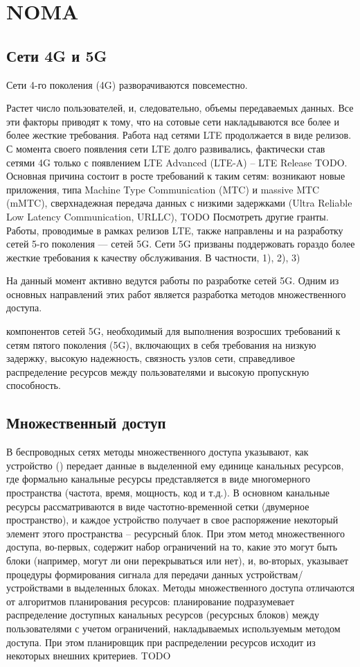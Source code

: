 \documentclass{book}
\numberwithin{theorem}{chapter}
\numberwithin{statement}{chapter}
\numberwithin{lemma}{chapter}
\theoremstyle{definition}
\numberwithin{task}{chapter}
\theoremstyle{remark}
\numberwithin{example}{chapter}
\theoremstyle{definition}
\numberwithin{definition}{chapter}
\theoremstyle{remark}
\theoremstyle{remark}
\numberwithin{lyrics}{section}
\begin{document}
\section{NOMA}
\subsection{Сети 4G и 5G}
Сети 4-го поколения (4G) разворачиваются повсеместно. 

Растет число пользователей, и, следовательно, объемы передаваемых данных. Все эти факторы приводят к тому, что на сотовые сети накладываются все более и более жесткие требования. Работа над сетями LTE продолжается в виде релизов. С момента своего появления сети LTE долго развивались, фактически став сетями 4G только с появлением LTE Advanced (LTE-A) -- LTE Release TODO.
Основная причина состоит в росте требований к таким сетям: возникают новые приложения, типа Machine Type Communication (MTC) и massive MTC (mMTC), сверхнадежная передача данных с низкими задержками (Ultra Reliable Low Latency Communication, URLLC), TODO Посмотреть другие гранты. Работы, проводимые в рамках релизов LTE, также направлены и на разработку сетей 5-го поколения --- сетей 5G. Сети 5G призваны поддержовать 
гораздо более жесткие требования к качеству обслуживания. В частности, 1), 2), 3)

На данный момент активно ведутся работы по разработке сетей 5G. Одним из основных направлений этих работ является разработка методов множественного доступа.

 компонентов сетей 5G, необходимый для выполнения возросших требований к сетям пятого поколения (5G), включающих в себя требования на низкую задержку, высокую надежность, связность узлов сети, справедливое распределение ресурсов между пользователями и высокую пропускную способность. 

\subsection{Множественный доступ}
В беспроводных сетях методы множественного доступа указывают, как устройство () передает данные в выделенной ему единице канальных ресурсов, где формально канальные ресурсы представляется в виде многомерного пространства (частота, время, мощность, код и т.д.). В основном канальные ресурсы рассматриваются в виде частотно-временной сетки (двумерное пространство), и каждое устройство получает в свое распоряжение некоторый элемент этого пространства -- ресурсный блок. При этом метод множественного доступа, во-первых,  содержит набор ограничений на то, какие это могут быть блоки (например, могут ли они перекрываться или нет), и, во-вторых, указывает процедуры формирования сигнала для передачи данных устройствам/устройствами в выделенных блоках. Методы множественного доступа отличаются от алгоритмов планирования ресурсов: планирование подразумевает распределение доступных канальных ресурсов (ресурсных блоков) между пользователями с учетом ограничений, накладываемых используемым методом доступа. При этом планировщик при распределении ресурсов исходит из некоторых внешних критериев. TODO
\end{document}
